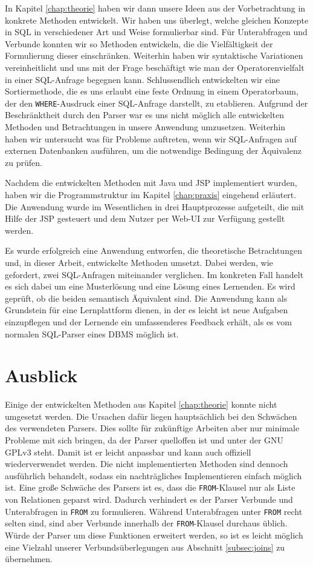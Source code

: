 In Kapitel \ref{chap:theorie} haben wir dann unsere Ideen aus der Vorbetrachtung in konkrete Methoden entwickelt. Wir haben uns überlegt, welche gleichen Konzepte in SQL in verschiedener Art und Weise formulierbar sind. Für Unterabfragen und Verbunde konnten wir so Methoden entwickeln, die die Vielfältigkeit der Formulierung dieser einschränken. Weiterhin haben wir syntaktische Variationen vereinheitlicht und uns mit der Frage beschäftigt wie man der Operatorenvielfalt in einer SQL-Anfrage begegnen kann. Schlussendlich entwickelten wir eine Sortiermethode, die es uns erlaubt eine feste Ordnung in einem Operatorbaum, der den \verb|WHERE|-Ausdruck einer SQL-Anfrage darstellt, zu etablieren. Aufgrund der Beschränktheit durch den Parser war es uns nicht möglich alle entwickelten Methoden und Betrachtungen in unsere Anwendung umzusetzen. Weiterhin haben wir untersucht was für Probleme auftreten, wenn wir SQL-Anfragen auf externen Datenbanken ausführen, um die notwendige Bedingung der Äquivalenz zu prüfen.

Nachdem die entwickelten Methoden mit Java und JSP implementiert wurden, haben wir die Programmstruktur im Kapitel \ref{chap:praxis} eingehend erläutert. Die Anwendung wurde im Wesentlichen in drei Hauptprozesse aufgeteilt, die mit Hilfe der JSP gesteuert und dem Nutzer per Web-UI zur Verfügung gestellt werden. 

Es wurde erfolgreich eine Anwendung entworfen, die theoretische Betrachtungen und, in dieser Arbeit, entwickelte Methoden umsetzt. Dabei werden, wie gefordert, zwei SQL-Anfragen miteinander verglichen. Im konkreten Fall handelt es sich dabei um eine Musterlösung und eine Lösung eines Lernenden. Es wird geprüft, ob die beiden semantisch Äquivalent sind. Die Anwendung kann als Grundstein für eine Lernplattform dienen, in der es leicht ist neue Aufgaben einzupflegen und der Lernende ein umfassenderes Feedback erhält, als es vom normalen SQL-Parser eines DBMS möglich ist.

\section{Ausblick}

Einige der entwickelten Methoden aus Kapitel \ref{chap:theorie} konnte nicht umgesetzt werden. Die Ursachen dafür liegen hauptsächlich bei den Schwächen des verwendeten Parsers. Dies sollte für zukünftige Arbeiten aber nur minimale Probleme mit sich bringen, da der Parser quelloffen ist und unter der GNU GPLv3 steht. Damit ist er leicht anpassbar und kann auch offiziell wiederverwendet werden. Die nicht implementierten Methoden sind dennoch ausführlich behandelt, sodass ein nachträgliches Implementieren einfach möglich ist. Eine große Schwäche des Parsers ist es, dass die \verb|FROM|-Klausel nur als Liste von Relationen geparst wird. Dadurch verhindert es der Parser Verbunde und Unterabfragen in \verb|FROM| zu formulieren. Während Unterabfragen unter \verb|FROM| recht selten sind, sind aber Verbunde innerhalb der \verb|FROM|-Klausel durchaus üblich. Würde der Parser um diese Funktionen erweitert werden, so ist es leicht möglich eine Vielzahl unserer Verbundsüberlegungen aus Abschnitt \ref{subsec:joins} zu übernehmen.

